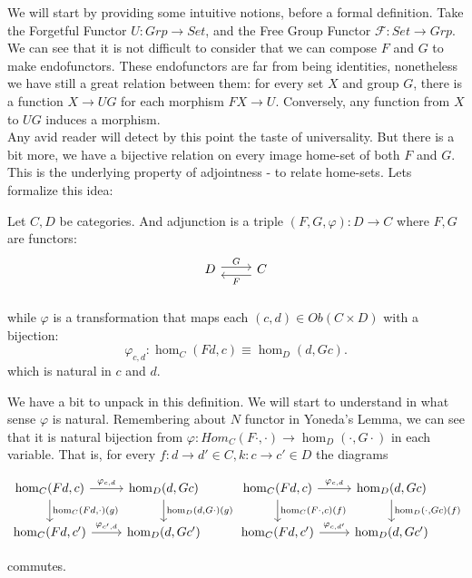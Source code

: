 We  will start by providing some intuitive notions, before a formal definition. Take the Forgetful Functor $U:Grp\to Set$, and the Free Group Functor $\mathcal{F}:Set\to Grp$. We can see that it is not difficult to consider that we can compose $F$ and $G$ to make endofunctors. These endofunctors are far from being identities, nonetheless we have still a great relation between them: for every set $X$ and group $G$, there is a function $X \to UG$ for each morphism $FX\to U$. Conversely, any function from $X$ to $UG$ induces a morphism. \\

Any avid reader will detect by this point the taste of universality. But there is a bit more, we have a bijective relation on every image home-set of both $F$ and $G$. This is the underlying property of adjointness - to relate home-sets. Lets formalize this idea:
\begin{definition}
  Let $C,D$ be categories. And adjunction is a triple $(F,G,\varphi):D\to C$ where $F,G$ are functors:
  \[
    \begin{tikzcd}
      D\arrow[r, shift left=.5ex, "G"{name=F}] &
      C\arrow[l, shift left=1ex, "F"{name=G}] \\
    \end{tikzcd}
  \]
  while $\varphi$ is a transformation that maps each $(c,d) \in Ob(C\times D)$ with a bijection:
  \[
    \varphi_{c,d}:\hom_C(Fd, c)\equiv\hom_D(d, Gc).
  \]
  which is natural in $c$ and $d$.
\end{definition}

We have a bit to unpack in this definition. We will start to understand in what sense $\varphi$ is natural. Remembering about $N$ functor in Yoneda's Lemma, we can see that it is natural bijection from $\varphi:Hom_C(F\cdot, \cdot)\to \hom_D(\cdot, G\cdot)$ in each variable. That is,  for every $f:d\to d'\in C,k:c\to c' \in D$ the diagrams

\[
\begin{tikzcd}
 \hom_C(Fd,c) \arrow{d}{\hom_C(Fd,\cdot)(g)}\arrow{r}{\varphi_{c,d}}
 &\hom_D(d,Gc)\arrow{d}{\hom_D(d,G\cdot)(g)}&
   \hom_C(Fd,c) \arrow{d}{\hom_C(F\cdot,c)(f)}\arrow{r}{\varphi_{c,d}}
    &\hom_D(d,Gc)\arrow{d}{\hom_D(\cdot,Gc)(f)}\\
 \hom_C(Fd,c') \arrow{r}{\varphi_{c',d}}  &\hom_D(d,Gc')&
    \hom_C(Fd,c') \arrow{r}{\varphi_{c,d'}}  &\hom_D(d,Gc')
  \end{tikzcd}
\]

commutes. \\

